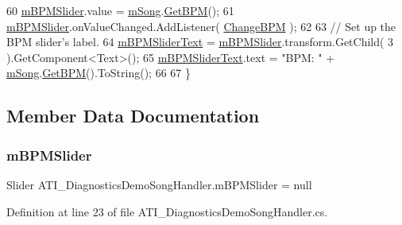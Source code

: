 \begin{DoxyCode}
60         \hyperlink{class_a_t_i___diagnostics_demo_song_handler_ad501644f4b61fe763b75e5b63aa5badc}{mBPMSlider}.value = \hyperlink{class_a_t_i___diagnostics_demo_song_handler_a8d34a075cf131a43db5e81cba4c9ea9d}{mSong}.\hyperlink{group___song_pub_func_gaaaf3d27d474713d7d368e3fd4c570be0}{GetBPM}();
61         \hyperlink{class_a_t_i___diagnostics_demo_song_handler_ad501644f4b61fe763b75e5b63aa5badc}{mBPMSlider}.onValueChanged.AddListener( \hyperlink{class_a_t_i___diagnostics_demo_song_handler_a860f995ecf2cce11b2a9a3e8fe37237e}{ChangeBPM} );
62 
63         \textcolor{comment}{// Set up the BPM slider's label.}
64         \hyperlink{class_a_t_i___diagnostics_demo_song_handler_ada25fecbd1bc9aaf468b3206d62a9193}{mBPMSliderText} = \hyperlink{class_a_t_i___diagnostics_demo_song_handler_ad501644f4b61fe763b75e5b63aa5badc}{mBPMSlider}.transform.GetChild( 3 ).GetComponent<Text>();
65         \hyperlink{class_a_t_i___diagnostics_demo_song_handler_ada25fecbd1bc9aaf468b3206d62a9193}{mBPMSliderText}.text = \textcolor{stringliteral}{"BPM: "} + \hyperlink{class_a_t_i___diagnostics_demo_song_handler_a8d34a075cf131a43db5e81cba4c9ea9d}{mSong}.\hyperlink{group___song_pub_func_gaaaf3d27d474713d7d368e3fd4c570be0}{GetBPM}().ToString();
66 
67     \}
\end{DoxyCode}


\subsection{Member Data Documentation}
\mbox{\label{class_a_t_i___diagnostics_demo_song_handler_ad501644f4b61fe763b75e5b63aa5badc}} 
\subsubsection{\texorpdfstring{m\+B\+P\+M\+Slider}{mBPMSlider}}
{\footnotesize\ttfamily Slider A\+T\+I\+\_\+\+Diagnostics\+Demo\+Song\+Handler.\+m\+B\+P\+M\+Slider = null\hspace{0.3cm}{\ttfamily [private]}}



Definition at line 23 of file A\+T\+I\+\_\+\+Diagnostics\+Demo\+Song\+Handler.\+cs.

